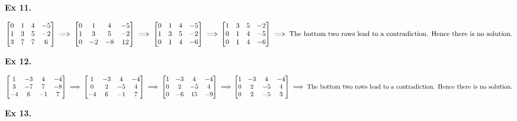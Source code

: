 \documentclass{article}
\begin{document}
\textbf{Ex 11.}

$
\begin{bmatrix}
0 &1 &4 &-5\\
1 &3 &5 &-2\\
3 &7 &7 &6
\end{bmatrix}
\implies
\begin{bmatrix}
0 &1 &4 &-5\\
1 &3 &5 &-2\\
0 &-2 &-8 &12
\end{bmatrix}
\implies
\begin{bmatrix}
0 &1 &4 &-5\\
1 &3 &5 &-2\\
0 &1 &4 &-6
\end{bmatrix}
\implies\\
\begin{bmatrix}
1 &3 &5 &-2\\
0 &1 &4 &-5\\
0 &1 &4 &-6
\end{bmatrix}
\implies \text{The bottom two rows lead to a contradiction. Hence there is no solution.}
$

\textbf{Ex 12.}

$
\begin{bmatrix}
1 &-3 &4 &-4\\
3 &-7 &7 &-8\\
-4 &6 &-1 &7
\end{bmatrix}
\implies
\begin{bmatrix}
1 &-3 &4 &-4\\
0 &2 &-5 &4\\
-4 &6 &-1 &7
\end{bmatrix}
\implies
\begin{bmatrix}
1 &-3 &4 &-4\\
0 &2 &-5 &4\\
0 &-6 &15 &-9
\end{bmatrix}
\implies\\
\begin{bmatrix}
1 &-3 &4 &-4\\
0 &2 &-5 &4\\
0 &2 &-5 &3
\end{bmatrix}
\implies \text{The bottom two rows lead to a contradiction. Hence there is no solution.}
$

\textbf{Ex 13.}
\end{document}

